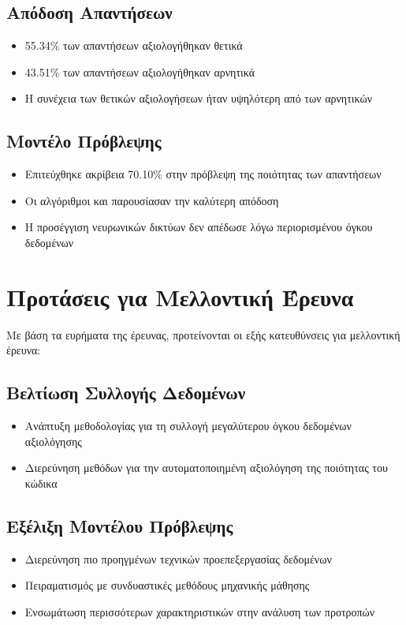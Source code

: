 \subsection*{Απόδοση Απαντήσεων}
\begin{itemize}
    \item 55.34\% των απαντήσεων αξιολογήθηκαν θετικά
    \item 43.51\% των απαντήσεων αξιολογήθηκαν αρνητικά
    \item Η συνέχεια των θετικών αξιολογήσεων ήταν υψηλότερη από των αρνητικών
\end{itemize}

\subsection*{Μοντέλο Πρόβλεψης}
\begin{itemize}
    \item Επιτεύχθηκε ακρίβεια 70.10\% στην πρόβλεψη της ποιότητας των απαντήσεων
    \item Οι αλγόριθμοι  και  παρουσίασαν την καλύτερη απόδοση
    \item Η προσέγγιση νευρωνικών δικτύων δεν απέδωσε λόγω περιορισμένου όγκου δεδομένων
\end{itemize}

\section{Προτάσεις για Μελλοντική Έρευνα}

Με βάση τα ευρήματα της έρευνας, προτείνονται οι εξής κατευθύνσεις για μελλοντική έρευνα:

\subsection*{Βελτίωση Συλλογής Δεδομένων}
\begin{itemize}
    \item Ανάπτυξη μεθοδολογίας για τη συλλογή μεγαλύτερου όγκου δεδομένων αξιολόγησης
    \item Διερεύνηση μεθόδων για την αυτοματοποιημένη αξιολόγηση της ποιότητας του κώδικα
\end{itemize}

\subsection*{Εξέλιξη Μοντέλου Πρόβλεψης}
\begin{itemize}
    \item Διερεύνηση πιο προηγμένων τεχνικών προεπεξεργασίας δεδομένων
    \item Πειραματισμός με συνδυαστικές μεθόδους μηχανικής μάθησης
    \item Ενσωμάτωση περισσότερων χαρακτηριστικών στην ανάλυση των προτροπών
\end{itemize}

